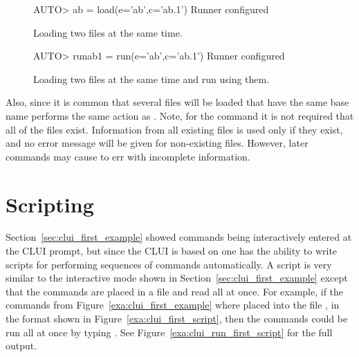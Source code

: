 \documentclass[12pt]{report}
\begin{document}
 \begin{figure}[htbp]
 {\small \begin{center} \begin{boxedverbatim}
 AUTO> ab = load(e='ab',c='ab.1')
 Runner configured
 \end{boxedverbatim}
 \end{center} 
 }
 \caption[Loading two files at the same time]
 {Loading two files at the same time.}
 \label{exa:clui_one_command}
 \end{figure}

 \begin{figure}[htbp]
 {\small \begin{center} \begin{boxedverbatim}
 AUTO> runab1 = run(e='ab',c='ab.1')
 Runner configured
 \end{boxedverbatim}
 \end{center} 
 }
 \caption[Loading two files at the same time and running]
 {Loading two files at the same time and run using them.}
 \label{exa:clui_one_run_command}
 \end{figure}

 Also, since it is common that several files will be loaded that
 have the same base name  performs the same 
 action as . 
 Note, for the command  it is not required that all
 of the files exist. Information from all existing files is used only
 if they exist, and no error message will be given for non-existing
 files. However, later  commands may cause \AUTO to err
 with incomplete information.

 \section{ Scripting }

 Section~\ref{sec:clui_first_example} showed commands
 being interactively entered at the \AUTO CLUI
 prompt, but since the \AUTO CLUI is based 
 on \python one has the ability to write
 scripts for performing sequences of commands
 automatically.  A \python script is very similar
 to the interactive mode shown in Section~\ref{sec:clui_first_example}
 except that the commands are placed in a file and
 read all at once.  For example, if the
 commands from Figure~\ref{exa:clui_first_example} where placed 
 into the file , in the format shown in 
 Figure~\ref{exa:clui_first_script}, then the commands
 could be run all at once by typing .
 See Figure~\ref{exa:clui_run_first_script} for the
 full output.
\end{document}
